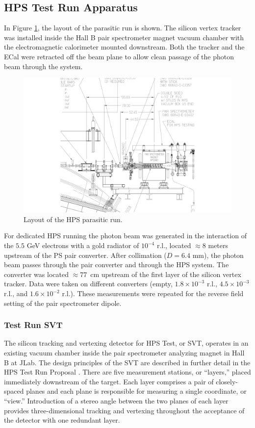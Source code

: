 \subsection{HPS Test Run Apparatus } 

In Figure \ref{fig:hpstest_layout}, the layout of the parasitic run is shown. The silicon vertex tracker was installed inside the Hall B pair spectrometer magnet vacuum chamber with the electromagnetic calorimeter mounted downstream.
Both the tracker and the ECal were retracted off the beam plane to allow clean passage of the photon beam through the system.
 
\begin{figure}[ht]
    \includegraphics[width=\textwidth]{test2012/HPS_dimensions}
\caption{\small{Layout of the HPS parasitic run.} }
\label{fig:hpstest_layout}
\end{figure}

For dedicated HPS running the photon beam was generated in the interaction of the $5.5$ GeV electrons with a gold radiator of $10^{-4}$ r.l., located $\approx 8$ meters upstream of the PS pair converter. After collimation ($D=6.4$ mm), the photon beam passes through the pair converter and through the HPS system. The converter was located $\approx 77$~cm upstream of the first layer of the silicon vertex tracker. Data were taken on different converters (empty, $1.8\times 10^{-3}$ r.l., $4.5\times 10^{-3}$ r.l., and $1.6\times 10^{-2}$ r.l.). These measurements were repeated for the reverse field setting of the pair spectrometer dipole.

\subsubsection{Test Run SVT}
\label{sec:svt_testrun}
The silicon tracking and vertexing detector for HPS Test, or SVT, operates in an existing vacuum chamber inside the pair spectrometer analyzing magnet in Hall B at JLab.  The design principles of the SVT are described in further detail in the HPS Test Run Proposal  \cite{HPS_tPROP}. There are five measurement stations, or ``layers,'' placed immediately downstream of the target. Each layer comprises a pair of closely-spaced planes and each plane is responsible for measuring a single coordinate, or ``view.'' Introduction of a stereo angle between the two planes of each layer provides three-dimensional tracking and vertexing throughout the acceptance of the detector with one redundant layer. 

